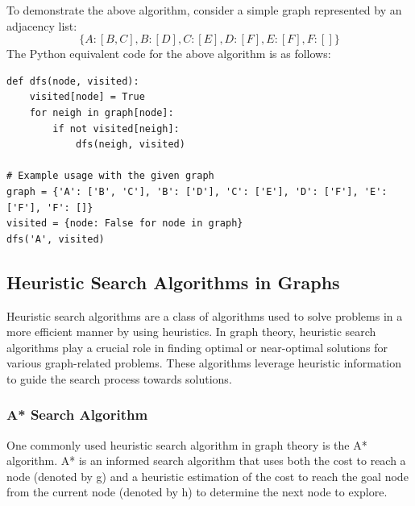 \documentclass[12pt]{book} %
\begin{document}
\FloatBarrier
To demonstrate the above algorithm, consider a simple graph represented by an adjacency list:
\[
\{A: [B, C], B: [D], C: [E], D: [F], E: [F], F: []\}
\]
\FloatBarrier
The Python equivalent code for the above algorithm is as follows:
\FloatBarrier
\begin{lstlisting}
def dfs(node, visited):
    visited[node] = True
    for neigh in graph[node]:
        if not visited[neigh]:
            dfs(neigh, visited)

# Example usage with the given graph
graph = {'A': ['B', 'C'], 'B': ['D'], 'C': ['E'], 'D': ['F'], 'E': ['F'], 'F': []}
visited = {node: False for node in graph}
dfs('A', visited)
\end{lstlisting}
\FloatBarrier
\subsection{Heuristic Search Algorithms in Graphs}
Heuristic search algorithms are a class of algorithms used to solve problems in a more efficient manner by using heuristics. In graph theory, heuristic search algorithms play a crucial role in finding optimal or near-optimal solutions for various graph-related problems. These algorithms leverage heuristic information to guide the search process towards solutions.
\subsubsection{A* Search Algorithm}
One commonly used heuristic search algorithm in graph theory is the A* algorithm. A* is an informed search algorithm that uses both the cost to reach a node (denoted by g) and a heuristic estimation of the cost to reach the goal node from the current node (denoted by h) to determine the next node to explore.
\end{document}
